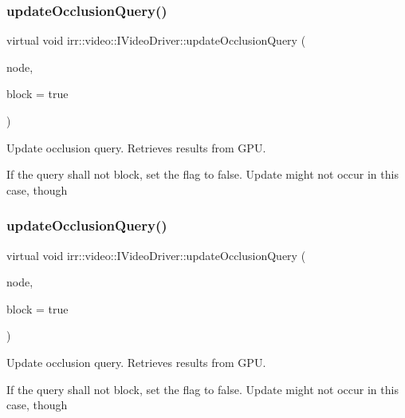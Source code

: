 \subsubsection{\texorpdfstring{update\+Occlusion\+Query()}{updateOcclusionQuery()}\hspace{0.1cm}{\footnotesize\ttfamily [1/2]}}
{\footnotesize\ttfamily virtual void irr\+::video\+::\+I\+Video\+Driver\+::update\+Occlusion\+Query (\begin{DoxyParamCaption}\item[{\hyperlink{classirr_1_1scene_1_1ISceneNode}{scene\+::\+I\+Scene\+Node} $\ast$}]{node,  }\item[{bool}]{block = {\ttfamily true} }\end{DoxyParamCaption})\hspace{0.3cm}{\ttfamily [pure virtual]}}



Update occlusion query. Retrieves results from G\+PU. 

If the query shall not block, set the flag to false. Update might not occur in this case, though \mbox{\label{classirr_1_1video_1_1IVideoDriver_a626061128fcf018516c6d931bd616ea7}} 
\subsubsection{\texorpdfstring{update\+Occlusion\+Query()}{updateOcclusionQuery()}\hspace{0.1cm}{\footnotesize\ttfamily [2/2]}}
{\footnotesize\ttfamily virtual void irr\+::video\+::\+I\+Video\+Driver\+::update\+Occlusion\+Query (\begin{DoxyParamCaption}\item[{\hyperlink{classirr_1_1scene_1_1ISceneNode}{scene\+::\+I\+Scene\+Node} $\ast$}]{node,  }\item[{bool}]{block = {\ttfamily true} }\end{DoxyParamCaption})\hspace{0.3cm}{\ttfamily [pure virtual]}}



Update occlusion query. Retrieves results from G\+PU. 

If the query shall not block, set the flag to false. Update might not occur in this case, though \mbox{\label{classirr_1_1video_1_1IVideoDriver_a407d6a1483f995060035340e0a92ce9b}} 
